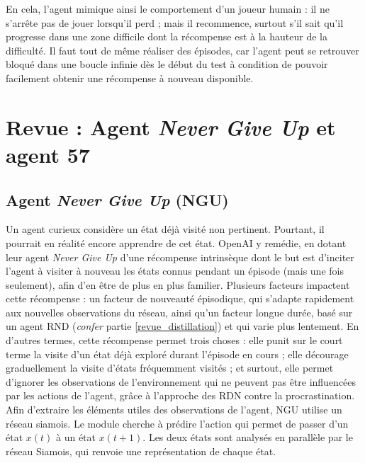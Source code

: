 \documentclass[a4paper,12pt]{report}
\begin{document}
\newline En cela, l'agent mimique ainsi le comportement d'un joueur humain : il ne s'arrête pas de jouer lorsqu’il perd ; mais il recommence, surtout s’il sait qu’il progresse dans une zone difficile dont la récompense est à la hauteur de la difficulté.
\newline Il faut tout de même réaliser des épisodes, car l’agent peut se retrouver bloqué dans une boucle infinie dès le début du test à condition de pouvoir facilement obtenir une récompense à nouveau disponible.

\newpage \section{Revue : Agent \textit{Never Give Up} \cite{ngu} et agent 57 \cite{agent57}}
\subsection{Agent \textit{Never Give Up} \cite{ngu} (NGU)}
\indent Un agent curieux considère un état déjà visité non pertinent. Pourtant, il pourrait en réalité encore apprendre de cet état.
\newline \indent OpenAI y remédie, en dotant leur agent \textit{Never Give Up} d’une récompense intrinsèque dont le but est d'inciter l’agent à visiter à nouveau les états connus pendant un épisode (mais une fois seulement), afin d'en être de plus en plus familier.
\newline
\newline \indent Plusieurs facteurs impactent cette récompense : un facteur de nouveauté épisodique, qui s’adapte rapidement aux nouvelles observations du réseau, ainsi qu'un facteur longue durée, basé sur un agent RND (\textit{confer} partie \ref{revue_distillation}) et qui varie plus lentement. En d’autres termes, cette récompense permet trois choses : elle punit sur le court terme la visite d’un état déjà exploré durant l'épisode en cours ; elle décourage graduellement la visite d’états fréquemment visités ; et surtout, elle permet d'ignorer les observations de l’environnement qui ne peuvent pas être influencées par les actions de l’agent, grâce à l'approche des RDN contre la procrastination.
\newline
\newline \indent Afin d'extraire les éléments utiles des observations de l’agent, NGU utilise un réseau siamois. Le module cherche à prédire l’action qui permet de passer d’un état $x(t)$ à un état $x(t+1)$. Les deux états sont analysés en parallèle par le réseau Siamois, qui renvoie une représentation de chaque état.
\end{document}
